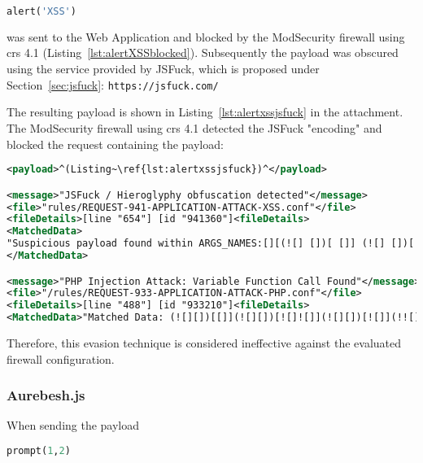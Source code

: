 \begin{lstlisting}[style=basicStyle, language=Python]
alert('XSS')
\end{lstlisting}

was sent to the Web Application and blocked by the ModSecurity firewall using \acrshort{crs} 4.1 (Listing~\ref{lst:alertXSSblocked}). Subsequently the payload was obscured using the service provided by JSFuck, which is proposed under Section~\ref{sec:jsfuck}: \verb|https://jsfuck.com/| 

The resulting payload is shown in Listing~\ref{lst:alertxssjsfuck} in the attachment. The ModSecurity firewall using \acrshort{crs} 4.1 detected the JSFuck "encoding" and blocked the request containing the payload:

\begin{lstlisting}[style=ruleStyle, language=XML, caption=alert('XSS') in JSFuck blocked, label={lst:alertxssjsfuckblocked}]
<payload>^(Listing~\ref{lst:alertxssjsfuck})^</payload>

<message>"JSFuck / Hieroglyphy obfuscation detected"</message>
<file>"rules/REQUEST-941-APPLICATION-ATTACK-XSS.conf"</file>
<fileDetails>[line "654"] [id "941360"]<fileDetails>
<MatchedData>
"Suspicious payload found within ARGS_NAMES:[][(![] [])[ []] (![] [])[! [] ! []] (![] [])[ ! []] (!![] [])[ []]][([][(![] [])[ []] (![] [])[! [] ! []] (![] [])[ ! []] (!![] [])[ []]] [])[ (11337 characters omitted)"
</MatchedData>

<message>"PHP Injection Attack: Variable Function Call Found"</message>
<file>"/rules/REQUEST-933-APPLICATION-ATTACK-PHP.conf"</file>
<fileDetails>[line "488"] [id "933210"]<fileDetails>
<MatchedData>"Matched Data: (![][])[[]](![][])[![]![]](![][])[![]](!![][])[[]]][([][(![][])[[]](![][])[![]![]](![][])[![]](!![][])[[]]][])[![]![]![]](!![][][(![][])[[]](![][])[![]![]](![][])[![]](!![][])[[]]])[![][ (21516 characters omitted)"</MatchedData>
\end{lstlisting}

Therefore, this evasion technique is considered ineffective against the evaluated firewall configuration.


\subsubsection{Aurebesh.js}
\label{sec:aurebeshevaluation}
When sending the payload 

\begin{lstlisting}[style=basicStyle, language=Python]
prompt(1,2)
\end{lstlisting}


